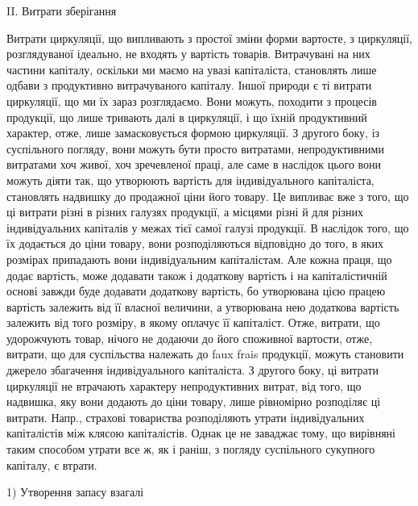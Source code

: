 II. Витрати зберігання

Витрати циркуляції, що випливають з простої зміни форми вартосте,
з циркуляції, розглядуваної ідеально, не входять у вартість товарів.
Витрачувані на них частини капіталу, оскільки ми маємо на увазі капіталіста,
становлять лише одбави з продуктивно витрачуваного капіталу.
Іншої природи є ті витрати циркуляції, що ми їх зараз розглядаємо. Вони
можуть, походити з процесів продукції, що лише тривають далі в циркуляції,
і що їхній продуктивний характер, отже, лише замасковується формою
циркуляції. З другого боку, із суспільного погляду, вони можуть бути
просто витратами, непродуктивними витратами хоч живої, хоч зречевленої
праці, але саме в наслідок цього вони можуть діяти так, що утворюють
вартість для індивідуального капіталіста, становлять надвишку до продажної
ціни його товару. Це випливає вже з того, що ці витрати різні в різних галузях
продукції, а місцями різні й для різних індивідуальних капіталів у межах
тієї самої галузі продукції. В наслідок того, що їх додається до ціни
товару, вони розподіляються відповідно до того, в яких розмірах припадають
вони індивідуальним капіталістам. Але кожна праця, що додає
вартість, може додавати також і додаткову вартість і на капіталістичній
основі завжди буде додавати додаткову вартість, бо утворювана цією працею
вартість залежить від її власної величини, а утворювана нею додаткова
вартість залежить від того розміру, в якому оплачує її капіталіст.
Отже, витрати, що удорожчують товар, нічого не додаючи до його
споживної вартости, отже, витрати, що для суспільства належать до faux
frais продукції, можуть становити джерело збагачення індивідуального
капіталіста. З другого боку, ці витрати циркуляції не втрачають характеру
непродуктивних витрат, від того, що надвишка, яку вони додають до
ціни товару, лише рівномірно розподіляє ці витрати. Напр., страхові
товариства розподіляють утрати індивідуальних капіталістів між клясою
капіталістів. Однак це не заваджає тому, що вирівняні таким способом
утрати все ж, як і раніш, з погляду суспільного сукупного капіталу, є втрати.

1) Утворення запасу взагалі

